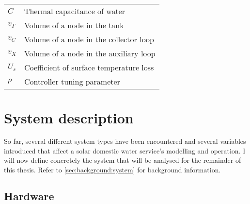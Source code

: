 \begin{table}
\begin{center}
\begin{tabular}{l l}
      $C$ & Thermal capacitance of water \\
      $v_T$ & Volume of a node in the tank \\
      $v_C$ & Volume of a node in the collector loop \\
      $v_X$ & Volume of a node in the auxiliary loop \\
      $U_s$ & Coefficient of surface temperature loss \\
      $\rho$ & Controller tuning parameter \\
      \bottomrule
   \end{tabular}
   \end{center}
\end{table}

\section{System description}
\label{sec:model:system}

So far, several different system types have been encountered and several variables introduced that affect a solar domestic water service's modelling and operation.
I will now define concretely the system that will be analysed for the remainder of this thesis.
Refer to \autoref{sec:background:system} for background information.

\subsection{Hardware}

